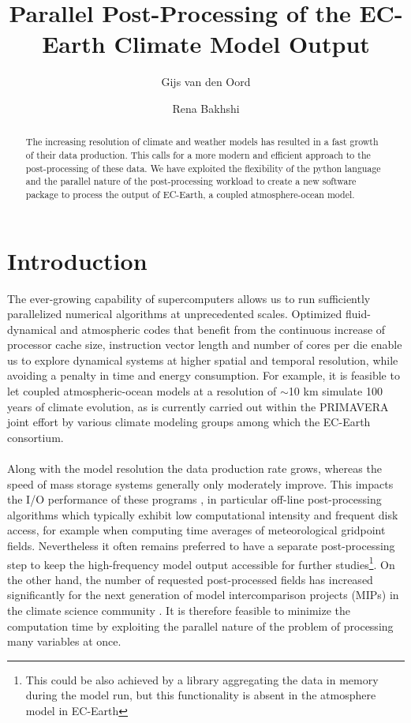\documentclass[a4paper,10pt]{article}
\title{Parallel Post-Processing of the EC-Earth Climate Model Output}
\author[1]{Gijs van den Oord}
\author[1]{Rena Bakhshi}
\affil[1]{Netherlands eScience Center}
\begin{document}
\maketitle

\begin{abstract}
The increasing resolution of climate and weather models has resulted in a fast 
growth of their data production. This calls for a more modern and efficient 
approach to the post-processing of these data. We have exploited the 
flexibility of the python language and the parallel nature of the 
post-processing workload to create a new software package to process the output 
of EC-Earth, a coupled atmosphere-ocean 
model. 
\end{abstract}

\section{Introduction}
The ever-growing capability of supercomputers allows us to run sufficiently 
parallelized numerical algorithms at unprecedented scales. Optimized 
fluid-dynamical and atmospheric codes that benefit from the continuous 
increase of processor cache size, instruction vector length and number of 
cores per die enable us to explore dynamical systems at higher 
spatial and temporal resolution, while avoiding a penalty in time and energy 
consumption. For example, it is feasible to let coupled atmospheric-ocean 
models at a resolution of $\sim$10 km simulate 100 years of climate 
evolution, as is currently carried out within the PRIMAVERA joint effort 
\cite{PRIMAVERA} by 
various climate modeling groups among which the EC-Earth \cite{ECEARTHv22} 
consortium.\\
\\
Along with the model resolution the data production rate grows, 
whereas the speed of mass storage systems generally only moderately improve. 
This impacts the I/O performance of these programs \cite{Asif20142370}, in 
particular off-line 
post-processing algorithms which typically exhibit low computational intensity 
and frequent disk access, for example when computing time averages of 
meteorological gridpoint fields. Nevertheless it often remains preferred to 
have a separate post-processing step to keep the high-frequency model output 
accessible for further studies\footnote{This could be also achieved by a 
library aggregating the data in memory during the model run, but 
this functionality is absent in the atmosphere model in EC-Earth}. On the other 
hand, the number of requested post-processed fields has increased significantly 
for the next generation of model intercomparison projects (MIPs) in the climate 
science community \cite{CMIP6}. It is therefore feasible to minimize the 
computation time by 
exploiting the parallel nature of the problem of processing many variables at 
once.\\
\end{document}
